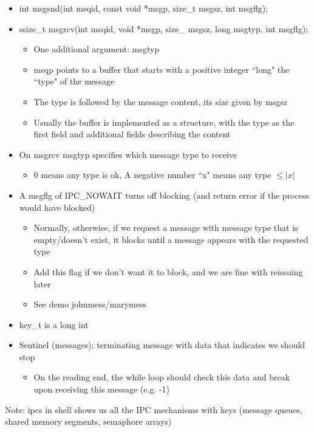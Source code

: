 \begin{itemize}
    \item int msgsnd(int msqid, const void *msgp, size\_t msgsz, int msgflg);
    \item ssize\_t msgrcv(int msqid, void *msgp, size\_ msgsz, long msgtyp, int msgflg);
    \begin{itemize}
        \item One additional argument: msgtyp
        \item msqp points to a buffer that starts with a positive integer ``long" the ``type" of the message
        \item The type is followed by the message content, its size given by msgsz
        \item Usually the buffer is implemented as a structure, with the type as the first field and additional fields describing the content
    \end{itemize}
    \item On msgrcv msgtyp specifies which message type to receive
    \begin{itemize}
        \item 0 means any type is ok, A negative number ``x" means any type $\leq |x|$
    \end{itemize}
    \item A msgflg of IPC\_NOWAIT turns off blocking (and return error if the process would have blocked)
    \begin{itemize}
        \item Normally, otherwise, if we request a message with message type that is empty/doesn't exist, it blocks until a message appears with the requested type
        \item Add this flag if we don't want it to block, and we are fine with reissuing later
        \item See demo johnmess/marymess
    \end{itemize}
    \item key\_t is a long int
    \item Sentinel (messages): terminating message with data that indicates we should stop
    \begin{itemize}
        \item On the reading end, the while loop should check this data and break upon receiving this message (e.g. -1)
    \end{itemize}
\end{itemize}
Note: ipcs in shell shows us all the IPC mechanisms with keys (message queues, shared memory segments, semaphore arrays)
